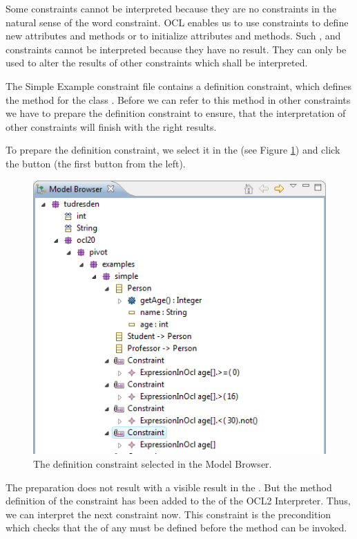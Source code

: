 Some constraints cannot be interpreted because they are no constraints in the natural sense of the word constraint. \acs{OCL} enables us to use constraints to define new attributes and methods or to initialize attributes and methods. Such ,  and  constraints cannot be interpreted because they have no result. They can only be used to alter the results of other constraints which shall be interpreted.

The Simple Example constraint file contains a definition constraint, which defines the method  for the class . Before we can refer to this method in other constraints we have to prepare the definition constraint to ensure, that the interpretation of other constraints will finish with the right results.

To prepare the definition constraint, we select it in the  (see Figure \ref{pic:interpret:interpret05}) and click the  button (the first button from the left).

\begin{figure}[!htbp]
	\centering
	\includegraphics[width=0.7\linewidth]{figures/interpreter/interpret05}
	\caption{The definition constraint selected in the Model Browser.}
	\label{pic:interpret:interpret05}
\end{figure}

The preparation does not result with a visible result in the . But the method definition of the constraint has been added to the  of the \acs{OCL}2 Interpreter. Thus, we can interpret the next constraint now. This constraint is the precondition which checks that the  of any  must be defined before the method  can be invoked.


